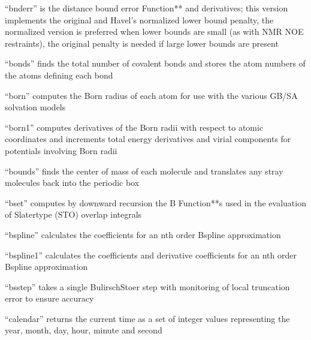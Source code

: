 \documentclass[letterpaper,11pt,english]{sphinxmanual}
\begin{document}

“bnderr” is the distance bound error Function** and derivatives; this version implements the original and Havel’s normalized lower bound penalty, the normalized version is preferred when lower bounds are small (as with NMR NOE restraints), the original penalty is needed if large lower bounds are present


“bonds” finds the total number of covalent bonds and stores the atom numbers of the atoms defining each bond


“born” computes the Born radius of each atom for use with the various GB/SA solvation models


“born1” computes derivatives of the Born radii with respect to atomic coordinates and increments total energy derivatives and virial components for potentials involving Born radii


“bounds” finds the center of mass of each molecule and translates any stray molecules back into the periodic box


“bset” computes by downward recursion the B Function**s used in the evaluation of Slater\sphinxhyphen{}type (STO) overlap integrals


“bspline” calculates the coefficients for an n\sphinxhyphen{}th order B\sphinxhyphen{}spline approximation


“bspline1” calculates the coefficients and derivative coefficients for an n\sphinxhyphen{}th order B\sphinxhyphen{}spline approximation


“bsstep” takes a single Bulirsch\sphinxhyphen{}Stoer step with monitoring of local truncation error to ensure accuracy


“calendar” returns the current time as a set of integer values representing the year, month, day, hour, minute and second
\end{document}
